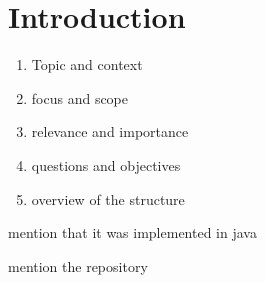 
\chapter{Introduction}

\begin{enumerate}
    \item
    Topic and context\\
    
    
    \item
    focus and scope
    
    \item
    relevance and importance
    
    \item
    questions and objectives
    
    \item
    overview of the structure
\end{enumerate}


mention that it was implemented in java

mention the repository